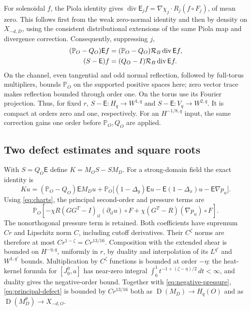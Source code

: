 \documentclass[11pt]{article}
\numberwithin{equation}{section}
\theoremstyle{remark}
\newcommand{\PP}{\mathbb P}
\newcommand{\divg}{\operatorname{div}}
\DeclareMathOperator{\Dom}{D}
\begin{document}
For solenoidal $f$, the Piola identity gives
$\divg\mathsf E_jf=\nabla\chi_j\cdot R_j(f\circ F_j)$, of mean
zero. This follows first from the weak zero-normal identity and then
by density on $X_{-d,D}$, using the consistent distributional
extensions of the same Piola map and divergence correction. Consequently,
suppressing $j$,
\begin{align}\label{eq:divergence-comparison}
 (\PP_O-Q_O)\mathsf E f
 &=(\PP_O-Q_O)\mathcal R_B\divg\mathsf E f,\\
 (S-\mathsf E)f&=(Q_O-I)\mathcal R_B\divg\mathsf E f.\notag
\end{align}
On the channel, even tangential and odd normal reflection, followed
by full-torus multipliers, bounds $\PP_O$ on the supported positive
spaces here; zero vector trace makes reflection bounded through
order one. On the torus use its Fourier projection. Thus, for fixed $r$,
$S-\mathsf E:H_q\to W^{1,q}$ and $S-\mathsf E:V_q\to W^{2,q}$.
It is compact at orders zero and one, respectively. For an
$H^{-1/8,q}$ input, the same correction gains one order before
$\PP_O,Q_O$ are applied.

\subsection{Two defect estimates and square roots}\label{sec:roots}

With $S=Q_O\mathsf E$ define $K=M_OS-SM_D$. For a strong-domain
field the exact identity is
\begin{equation}\label{eq:defect}
 Ku=(\PP_O-Q_O)\mathsf E M_Du
 +\PP_O\bigl[(1-\Delta_y)\mathsf E u
 -\mathsf E(1-\Delta_x)u-\mathsf E\nabla p_u\bigr].
\end{equation}
Using \eqref{eq:charts}, the principal second-order and pressure terms are
\begin{equation}\label{eq:principal-defect}
 \PP_O\left[-\chi R(GG^T-I)_{il}(\partial_{il}u)\circ F
 +\chi(G^T-R)(\nabla p_u)\circ F\right].
\end{equation}
The nonorthogonal pressure term is retained. Both coefficients have
supremum $Cr$ and Lipschitz norm $C$, including cutoff derivatives.
Their $C^\zeta$ norms are therefore at most $Cr^{1-\zeta}=Cr^{13/16}$.
Composition with the extended shear is bounded on $H^{-\eta,q}$,
uniformly in $r$, by duality and interpolation of its $L^{q'}$ and
$W^{1,q'}$ bounds. Multiplication by $C^\zeta$ functions is bounded
at order $-\eta$: the heat-kernel formula for
$[J_0^\eta,a]$ has near-zero integral
$\int_0^1t^{-1+(\zeta-\eta)/2}\,dt<\infty$, and duality gives the
negative-order bound. Together with \eqref{eq:negative-pressure},
\eqref{eq:principal-defect} is bounded by $Cr^{13/16}$ both as
$\Dom(M_D)\to H_q(O)$ and as
$\Dom(M_D^\theta)\to X_{-d,O}$.
\end{document}
